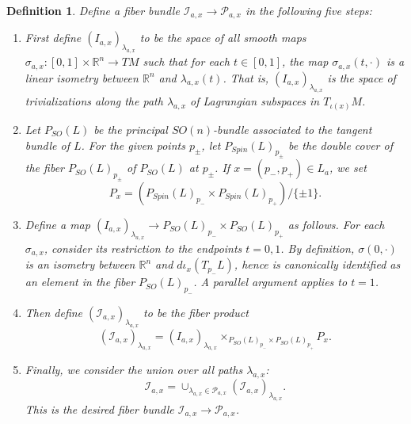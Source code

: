 \documentclass{amsart}
\newtheorem{definition}[theorem]{Definition}
\numberwithin{equation}{section}
\numberwithin{figure}{section}
\begin{document}
\begin{definition}
	Define a fiber bundle $\mathcal{I}_{a, x} \to \mathcal{P}_{a, x}$ in the following five steps:
\begin{enumerate}[label=(\roman*)]

\item First define $(I_{a, x})_{\lambda_{a, x}}$ to be the space of all smooth maps $\sigma_{a, x}: [0, 1] \times \mathbb{R}^{n} \to TM$ such that for each $t \in [0, 1]$, the map $\sigma_{a, x}(t, \cdot)$ is a linear isometry between $\mathbb{R}^{n}$ and $\lambda_{a, x}(t)$. That is, $(I_{a, x})_{\lambda_{a, x}}$ is the space of trivializations along the path $\lambda_{a, x}$ of Lagrangian subspaces in $T_{\iota(x)}M$.

\item Let $P_{SO}(L)$ be the principal $SO(n)$-bundle associated to the tangent bundle of $L$. For the given points $p_{\pm}$, let $P_{Spin}(L)_{p_{\pm}}$ be the double cover of the fiber $P_{SO}(L)_{p_{\pm}}$ of $P_{SO}(L)$ at $p_{\pm}$. If $x = (p_{-}, p_{+}) \in L_{a}$, we set
\begin{equation}\label{the spin fibers}
P_{x} = (P_{Spin}(L)_{p_{-}} \times P_{Spin}(L)_{p_{+}})/\{\pm 1\}.
\end{equation}

\item Define a map $(I_{a, x})_{\lambda_{a, x}} \to P_{SO}(L)_{p_{-}} \times P_{SO}(L)_{p_{+}}$ as follows. For each $\sigma_{a, x}$, consider its restriction to the endpoints $t = 0, 1$. By definition, $\sigma(0, \cdot)$ is an isometry between $\mathbb{R}^{n}$ and $d\iota_{x}(T_{p_{-}}L)$, hence is canonically identified as an element in the fiber $P_{SO}(L)_{p_{-}}$. A parallel argument applies to $t = 1$.

\item Then define $(\mathcal{I}_{a, x})_{\lambda_{a, x}}$ to be the fiber product
\begin{equation}
(\mathcal{I}_{a, x})_{\lambda_{a, x}} = (I_{a, x})_{\lambda_{a, x}} \times_{P_{SO}(L)_{p_{-}} \times P_{SO}(L)_{p_{+}}} P_{x}.
\end{equation}

\item Finally, we consider the union over all paths $\lambda_{a, x}$:
\begin{equation}
\mathcal{I}_{a, x} = \cup_{\lambda_{a, x} \in \mathcal{P}_{a, x}} (\mathcal{I}_{a, x})_{\lambda_{a, x}}.
\end{equation}
This is the desired fiber bundle $\mathcal{I}_{a, x} \to \mathcal{P}_{a, x}$.

\end{enumerate}
\end{definition}
\end{document}
